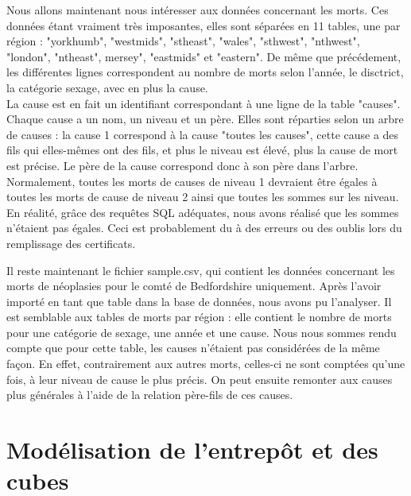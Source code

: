 \begin{paragraph}
Nous allons maintenant nous intéresser aux données concernant les morts. Ces données étant vraiment très imposantes, elles sont séparées en 11 tables, une par région : "yorkhumb", "westmids", "stheast", "wales", "sthwest", "nthwest", "london", "ntheast", mersey", "eastmids" et "eastern". De même que précédement, les différentes lignes correspondent au nombre de morts selon l'année, le disctrict, la catégorie sexage, avec en plus la cause. \\
La cause est en fait un identifiant correspondant à une ligne de la table "causes". Chaque cause a un nom, un niveau et un père. Elles sont réparties selon un arbre de causes : la cause 1 correspond à la cause "toutes les causes", cette cause a des fils qui elles-mêmes ont des fils, et plus le niveau est élevé, plus la cause de mort est précise. Le père de la cause correspond donc à son père dans l'arbre. Normalement, toutes les morts de causes de niveau 1 devraient être égales à toutes les morts de cause de niveau 2 ainsi que toutes les sommes sur les niveau. En réalité, grâce des requêtes SQL adéquates, nous avons réalisé que les sommes n'étaient pas égales. Ceci est probablement du à des erreurs ou des oublis lors du remplissage des certificats. \\
\end{paragraph}

\begin{paragraph}
Il reste maintenant le fichier sample.csv, qui contient les données concernant les morts de néoplasies pour le comté de Bedfordshire uniquement. Après l'avoir importé en tant que table dans la base de données, nous avons pu l'analyser. Il est semblable aux tables de morts par région : elle contient le nombre de morts pour une catégorie de sexage, une année et une cause. Nous nous sommes rendu compte que pour cette table, les causes n'étaient pas considérées de la même façon. En effet, contrairement aux autres morts, celles-ci ne sont comptées qu'une fois, à leur niveau de cause le plus précis. On peut ensuite remonter aux causes plus générales à l'aide de la relation père-fils de ces causes.
\end{paragraph}

\pagebreak


\chapter{Modélisation de l'entrepôt et des cubes}

